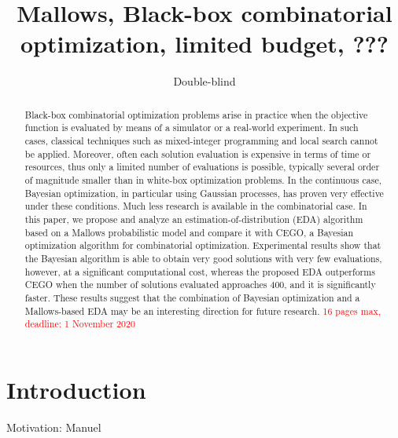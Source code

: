 \documentclass[runningheads]{llncs}
\title{Mallows, Black-box combinatorial optimization, limited budget,  ???}
\author{Double-blind}
\date{}%
\begin{document}
\maketitle

\begin{abstract}
  Black-box combinatorial optimization problems arise in practice when the
  objective function is evaluated by means of a simulator or a real-world
  experiment. In such cases, classical techniques such as mixed-integer
  programming and local search cannot be applied. Moreover, often each solution
  evaluation is expensive in terms of time or resources, thus only a limited
  number of evaluations is possible, typically several order of magnitude
  smaller than in white-box optimization problems. In the continuous case,
  Bayesian optimization, in particular using Gaussian processes, has proven
  very effective under these conditions. Much less research is available in the
  combinatorial case. In this paper, we propose and analyze an
  estimation-of-distribution (EDA) algorithm based on a Mallows probabilistic
  model and compare it with CEGO, a Bayesian optimization algorithm for
  combinatorial optimization. Experimental results show that the Bayesian
  algorithm is able to obtain very good solutions with very few evaluations,
  however, at a significant computational cost, whereas the proposed EDA
  outperforms CEGO when the number of solutions evaluated approaches 400, and
  it is significantly faster. These results suggest that the combination of
  Bayesian optimization and a Mallows-based EDA may be an interesting direction
  for future research.
\textcolor{red}{16 pages max, deadline: 1 November 2020}
\end{abstract}

\section{Introduction}

Motivation: Manuel
\end{document}
